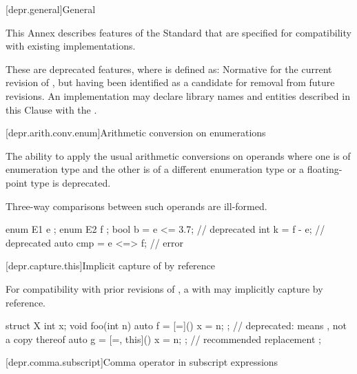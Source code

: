 
\newcommand{\requires}{\Fundesc{Requires}}

[depr.general]{General}

\pnum
This Annex describes features of the \Cpp{} Standard that are specified for compatibility with
existing implementations.

\pnum
These are deprecated features, where
is defined as:
Normative for the current revision of \Cpp{},
but having been identified as a candidate for removal from future revisions.
An implementation may declare library names and entities described in this Clause with the
.

[depr.arith.conv.enum]{Arithmetic conversion on enumerations}

\pnum
The ability to apply the usual arithmetic conversions
on operands where one is of enumeration type
and the other is of a different enumeration type
or a floating-point type
is deprecated.
\begin{note}
Three-way comparisons between such operands are ill-formed.
\end{note}
\begin{example}
\begin{codeblock}
enum E1 { e };
enum E2 { f };
bool b = e <= 3.7;              // deprecated
int k = f - e;                  // deprecated
auto cmp = e <=> f;             // error
\end{codeblock}
\end{example}

[depr.capture.this]{Implicit capture of  by reference}

\pnum
For compatibility with prior revisions of \Cpp{},
a  with 
\tcode{=} may implicitly capture
 by reference.
\begin{example}
\begin{codeblock}
struct X {
  int x;
  void foo(int n) {
    auto f = [=]() { x = n; };          // deprecated:  means , not a copy thereof
    auto g = [=, this]() { x = n; };    // recommended replacement
  }
};
\end{codeblock}
\end{example}

[depr.comma.subscript]{Comma operator in subscript expressions}

